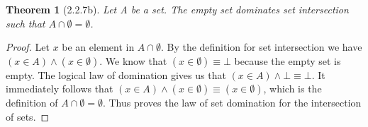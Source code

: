 \documentclass[a4paper, 12pt]{article}
\theoremstyle{plain}
\newtheorem*{theorem*}{Theorem}
\begin{document}
	
	\begin{theorem*}[2.2.7b]
		Let A be a set. The empty set dominates set intersection such that $A \cap \emptyset = \emptyset$.
	\end{theorem*}
	
	\begin{proof}
		Let $x$ be an element in $A \cap \emptyset$. By the definition for set intersection we have $(x \in A) \land (x \in \emptyset)$. We know that $(x \in \emptyset) \equiv \bot$ because the empty set is empty. The logical law of domination gives us that $(x \in A) \land \bot \equiv \bot$. It immediately follows that $(x \in A) \land (x \in \emptyset) \equiv (x \in \emptyset)$, which is the definition of $A \cap \emptyset = \emptyset$. Thus proves the law of set domination for the intersection of sets. 
	\end{proof}
\end{document}
